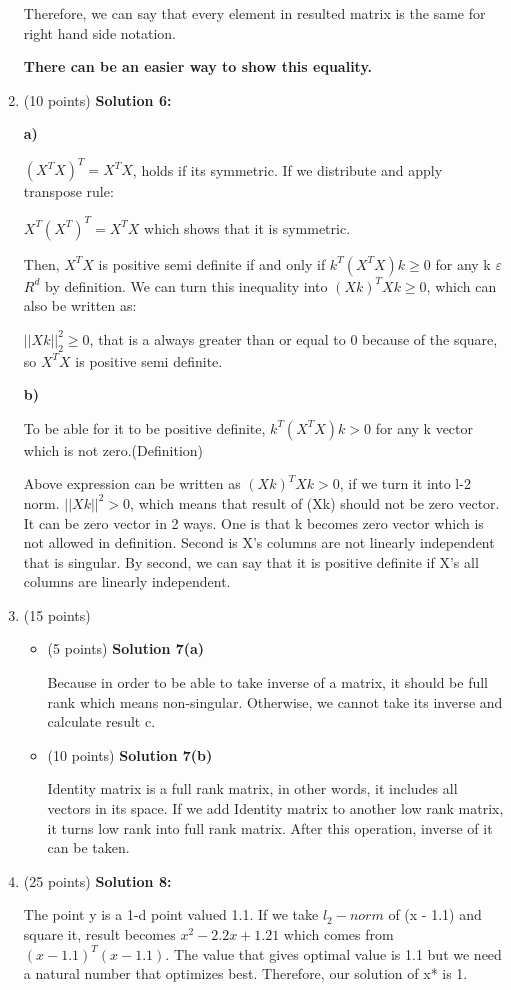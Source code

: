\documentclass[11pt]{article}
\begin{document}
\begin{enumerate}
Therefore, we can say that every element in resulted matrix is the same for right hand side notation.

\textbf{There can be an easier way to show this equality.}

\item (10 points) \textbf{Solution 6:}

\textbf{a)}

$(X^T X )^T = X^T X $, holds if its symmetric. If we distribute and apply transpose rule:

$X^T (X^T)^T = X^T X$ which shows that it is symmetric.

Then, $X^T X$ is positive semi definite if and only if $k^T (X^T X )k \geq 0 $ for any k $\varepsilon$ $R^d$ by definition. We can turn this inequality into $(Xk)^T Xk \geq 0$, which can also be written as:

$|| Xk ||^2_2 \geq 0$, that is a always greater than or equal to 0 because of the square, so $X^T X$ is positive semi definite.

\textbf{b)}

To be able for it to be positive definite, $k^T (X^T X) k > 0$ for any k vector which is not zero.(Definition)

Above expression can be written as $(Xk)^T Xk > 0$, if we turn it into l-2 norm. $|| Xk ||^2 > 0$, which means that result of (Xk) should not be zero vector. It can be zero vector in 2 ways. One is that k becomes zero vector which is not allowed in definition. Second is X's columns are not linearly independent that is singular. By second, we can say that it is positive definite if X's all columns are linearly independent.

\item (15 points) 
\begin{itemize}
    \item (5 points) \textbf{Solution 7(a)}
    
    Because in order to be able to take inverse of a matrix, it should be full rank which means non-singular. Otherwise, we cannot take its inverse and calculate result c.
    \item (10 points) \textbf{Solution 7(b)}
    
    Identity matrix is a full rank matrix, in other words, it includes all vectors in its space. If we add Identity matrix to another low rank matrix, it turns low rank into full rank matrix. 
    After this operation, inverse of it can be taken.
\end{itemize} 

\item (25 points) \textbf{Solution 8:}

The point y is a 1-d point valued 1.1. If we take $l_2 - norm$  of (x - 1.1) and square it, result becomes $x^2 - 2.2x + 1.21$ which comes from $(x - 1.1)^T (x - 1.1)$. The value that gives optimal value is 1.1 but we need a natural number that optimizes best. Therefore, our solution of x* is 1.

\end{enumerate}
\end{document}
